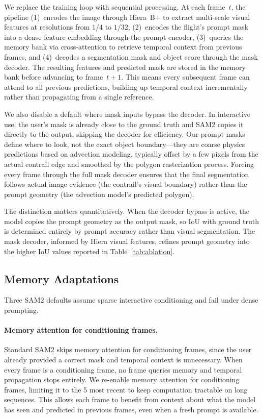 \documentclass[review]{elsarticle}
\begin{document}
We replace the training loop with sequential processing. At each frame~$t$, the pipeline (1)~encodes the image through Hiera~B+ to extract multi-scale visual features at resolutions from $1/4$ to $1/32$, (2)~encodes the flight's prompt mask into a dense feature embedding through the prompt encoder, (3)~queries the memory bank via cross-attention to retrieve temporal context from previous frames, and (4)~decodes a segmentation mask and object score through the mask decoder. The resulting features and predicted mask are stored in the memory bank before advancing to frame~$t{+}1$. This means every subsequent frame can attend to all previous predictions, building up temporal context incrementally rather than propagating from a single reference.

We also disable a default where mask inputs bypass the decoder. In interactive use, the user's mask is already close to the ground truth and SAM2 copies it directly to the output, skipping the decoder for efficiency. Our prompt masks define where to look, not the exact object boundary---they are coarse physics predictions based on advection modeling, typically offset by a few pixels from the actual contrail edge and smoothed by the polygon rasterization process. Forcing every frame through the full mask decoder ensures that the final segmentation follows actual image evidence (the contrail's visual boundary) rather than the prompt geometry (the advection model's predicted polygon).

The distinction matters quantitatively. When the decoder bypass is active, the model copies the prompt geometry as the output mask, so IoU with ground truth is determined entirely by prompt accuracy rather than visual segmentation. The mask decoder, informed by Hiera visual features, refines prompt geometry into the higher IoU values reported in Table~\ref{tab:ablation}.

\subsection{Memory Adaptations}

Three SAM2 defaults assume sparse interactive conditioning and fail under dense prompting.

\paragraph{Memory attention for conditioning frames.} Standard SAM2 skips memory attention for conditioning frames, since the user already provided a correct mask and temporal context is unnecessary. When every frame is a conditioning frame, no frame queries memory and temporal propagation stops entirely. We re-enable memory attention for conditioning frames, limiting it to the 5 most recent to keep computation tractable on long sequences. This allows each frame to benefit from context about what the model has seen and predicted in previous frames, even when a fresh prompt is available.
\end{document}
